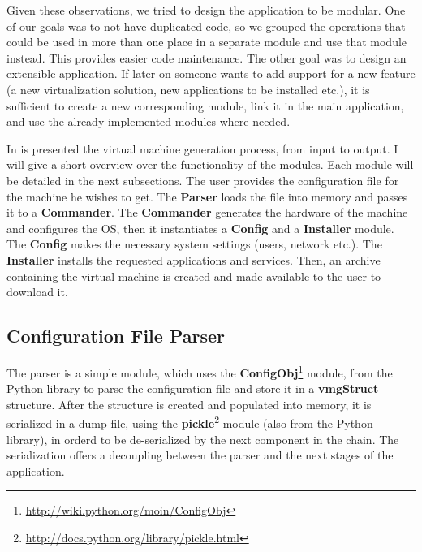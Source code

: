 
Given these observations, we tried to design the application to be modular. One
of our goals was to not have duplicated code, so we grouped the operations that
could be used in more than one place in a separate module and use that module
instead. This provides easier code maintenance. The other goal was to design an
extensible application. If later on someone wants to add support for a new
feature (a new virtualization solution, new applications to be installed etc.),
it is sufficient to create a new corresponding module, link it in the main
application, and use the already implemented modules where needed. 

In  is presented the virtual machine
generation process, from input to output. I will give a short overview over the
functionality of the modules. Each module will be detailed in the next
subsections. The user provides the configuration file for the machine he wishes
to get. The \textbf{Parser} loads the file into memory and passes it to a
\textbf{Commander}. The \textbf{Commander} generates the hardware of the
machine and configures the OS, then it instantiates a \textbf{Config} and a
\textbf{Installer} module. The \textbf{Config} makes the necessary system
settings (users, network etc.). The \textbf{Installer} installs the requested
applications and services. Then, an archive containing the virtual machine is
created and made available to the user to download it. 


\subsection{Configuration File Parser}
\label{sub-sec:parser}
The parser is a simple module, which uses the
\textbf{ConfigObj}\footnote{\url{http://wiki.python.org/moin/ConfigObj}}
module, from the Python library to parse the configuration file and store it in
a \textbf{vmgStruct} structure. After the structure is created and populated
into memory, it is serialized in a dump file, using the
\textbf{pickle}\footnote{\url{http://docs.python.org/library/pickle.html}}
module (also from the Python library), in orderd to be de-serialized by the
next component in the chain. The serialization offers a decoupling between the
parser and the next stages of the application.

